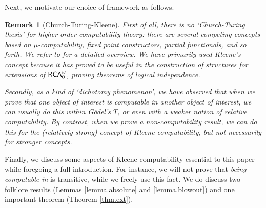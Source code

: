 \documentclass[reqno]{amsart}
\newtheorem{remark}[thm]{Remark}
\def\RCA{\textup{\textsf{RCA}}}
\numberwithin{equation}{section}
\numberwithin{thm}{section}
\begin{document}
Next, we motivate our choice of framework as follows.  
\begin{remark}[Church-Turing-Kleene]{\em 
First of all, there is no `Church-Turing thesis' for higher-order computability theory: there are several competing concepts based on $\mu$-computability, fixed point constructors, partial functionals, and so forth.  
We refer to \cite{longmann} for a detailed overview. We have primarily used Kleene's concept because it has proved to be useful in the construction of structures for extensions of $\RCA_0^\omega$, proving theorems of logical independence. 

\smallskip

Secondly, as a kind of `dichotomy phenomenon', we have observed that when we prove that one object of interest is computable in another object of interest, we can usually do this within G\"odel's $T$, or even with a weaker notion of relative computability.  By contrast, when we prove a \emph{non-computability} result, we can do this for the (relatively strong) concept of Kleene computability, but \emph{not necessarily} for stronger concepts.}
\end{remark}
Finally, we discuss some aspects of Kleene computability essential to this paper while foregoing a full introduction.  
For instance, we will not prove that \emph{being computable in} is transitive, while we freely use this fact.  We
do discuss two folklore results (Lemmas \ref{lemma.absolute} and \ref{lemma.blowout}) and one important theorem (Theorem \ref{thm.ext}).

\smallskip
\end{document}
